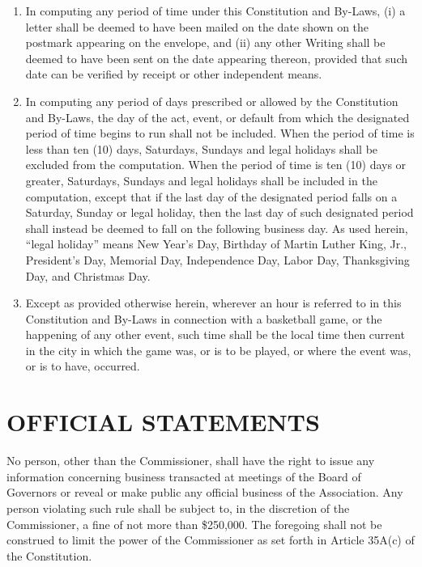 \documentclass[]{book}
\providecommand{\tightlist}{%
  \setlength{\itemsep}{0pt}\setlength{\parskip}{0pt}}
\theoremstyle{definition}
\theoremstyle{definition}
\theoremstyle{definition}
\theoremstyle{remark}
\begin{document}
\begin{enumerate}
\def\labelenumi{(\alph{enumi})}
\tightlist
\item
  In computing any period of time under this Constitution and By-Laws,
  (i) a letter shall be deemed to have been mailed on the date shown on
  the postmark appearing on the envelope, and (ii) any other Writing
  shall be deemed to have been sent on the date appearing thereon,
  provided that such date can be verified by receipt or other
  independent means.
\item
  In computing any period of days prescribed or allowed by the
  Constitution and By-Laws, the day of the act, event, or default from
  which the designated period of time begins to run shall not be
  included. When the period of time is less than ten (10) days,
  Saturdays, Sundays and legal holidays shall be excluded from the
  computation. When the period of time is ten (10) days or greater,
  Saturdays, Sundays and legal holidays shall be included in the
  computation, except that if the last day of the designated period
  falls on a Saturday, Sunday or legal holiday, then the last day of
  such designated period shall instead be deemed to fall on the
  following business day. As used herein, ``legal holiday'' means New
  Year's Day, Birthday of Martin Luther King, Jr., President's Day,
  Memorial Day, Independence Day, Labor Day, Thanksgiving Day, and
  Christmas Day.
\item
  Except as provided otherwise herein, wherever an hour is referred to
  in this Constitution and By-Laws in connection with a basketball game,
  or the happening of any other event, such time shall be the local time
  then current in the city in which the game was, or is to be played, or
  where the event was, or is to have, occurred.
\end{enumerate}

\section{OFFICIAL STATEMENTS}\label{official-statements}

No person, other than the Commissioner, shall have the right to issue
any information concerning business transacted at meetings of the Board
of Governors or reveal or make public any official business of the
Association. Any person violating such rule shall be subject to, in the
discretion of the Commissioner, a fine of not more than \$250,000. The
foregoing shall not be construed to limit the power of the Commissioner
as set forth in Article 35A(c) of the Constitution.
\end{document}
